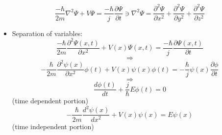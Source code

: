 \documentclass{article}
\begin{document}
\begin{itemize}
\begin{equation}
    \frac{-\hbar}{2m}\nabla^2\Psi+V\Psi=\frac{-\hbar}{j}\frac{\partial\Psi}{\partial t} \ni \nabla^2\Psi=\frac{\partial^2\Psi}{\partial x^2}+\frac{\partial^2\Psi}{\partial y^2}+\frac{\partial^2\Psi}{\partial z^2}\end{equation}
\item Separation of variables:
  \begin{equation}\label{separated}
    \frac{-\hbar}{2m}\frac{\partial^2\Psi(x,t)}{\partial x^2}+V(x)\Psi(x,t)=\frac{-\hbar}{j}\frac{\partial\Psi(x,t)}{\partial t}
  \end{equation}
  $$\Rightarrow$$
  \begin{equation}\label{still_separated}
    -\frac{\hbar}{2m}\frac{\partial^2\psi(x)}{\partial x^2}\phi(t)+V(x)\psi(x)\phi(t)=-\frac{\hbar}{j}\psi(x)\frac{\partial\phi}{\partial t}
  \end{equation}
  $$\Rightarrow$$
  \begin{equation}\label{time_dependent}
    \frac{d\phi(t)}{dt}+\frac{j}{\hbar}E\phi(t)=0	
  \end{equation} (time dependent portion)
  \begin{equation}\label{time_independent}
    -\frac{\hbar}{2m}\frac{d^2\psi(x)}{dx^2}+V(x)\psi(x)=E\psi(x)
  \end{equation} (time independent portion)
  

\end{itemize}
\end{document}
